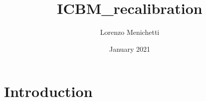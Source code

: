 \documentclass{article}
\title{ICBM_recalibration}
\author{Lorenzo Menichetti}
\date{January 2021}
\begin{document}
\maketitle

\section{Introduction}
\end{document}
